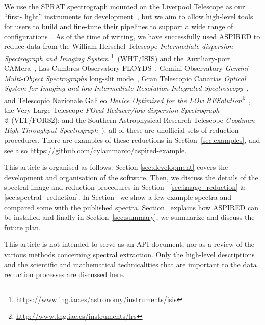 \documentclass[linenumbers, twocolumn]{aastex631}
\begin{document}
We use the SPRAT spectrograph mounted on the Liverpool Telescope as our ``first-
light'' instruments for
development~\citep{2014SPIE.9147E..8HP}, but we aim to allow high-level tools
for users to build and fine-tune their pipelines to support a wide range of
configurations~\citep{2020arXiv201203505L, marco_2021_4463569}. As of the time
of writing, we have successfully used \textsc{ASPIRED} to reduce data from the
William Herschel Telescope \textit{Intermediate-dispersion Spectrograph and
Imaging System} \footnote{\url{https://www.ing.iac.es/astronomy/instruments/isis}}~(WHT/ISIS)
and the Auxiliary-port CAMera~\citep[ACAM;][]{2008SPIE.7014E..6XB}, Las Cumbres
Observatory FLOYDS~\citep[LCO/FLOYDS;][]{2013PASP..125.1031B}, Gemini Observatory
\textit{Gemini Multi-Object Spectrographs} long-slit
mode~\citep[Gemini/GMOS-LS;][]{2004PASP..116..425H}, Gran Telescopio Canarias
\textit{Optical System for Imaging and low-Intermediate-Resolution Integrated
Spectroscopy}~\citep[GTC/OSIRIS;][]{2000SPIE.4008..623C}, and Telescopio
Nazionale Galileo \textit{Device Optimised for the LOw
RESolution\footnote{\url{http://www.tng.iac.es/instruments/lrs}}}~\citep[TNG/DOLORES;][]{1999ldss.work..157M},
the Very Large Telescope \textit{FOcal Reducer/low dispersion Spectrograph 2}~(VLT/FORS2); and the Southern Astrophysical Research Telescope \textit{Goodman High Throughput Spectrograph}~\citep[SOAR/GHTS][]{2004SPIE.5492..331C}).
all of these are unofficial sets of reduction procedures. There
are examples of these reductions in Section~\ref{sec:examples}, and see also
\url{https://github.com/cylammarco/aspired-example}.

This article is organised as follows: Section \textsection\ref{sec:development}
covers the development and organisation of the software. Then, we discuss the
details of the spectral image and reduction procedures in Section~\textsection
\ref{sec:image_reduction} \& \ref{sec:spectral_reduction}. In
Section~\textsection{\ref{sec:examples}} we show a few example spectra and
compared some with the published spectra.
Section~\textsection{\ref{sec:distribution}}
explains how \textsc{ASPIRED} can be installed and finally in 
Section~\textsection\ref{sec:summary}, we summarize and discuss the future
plan.

This article is not intended to serve as an API document, nor as a review of the
various methods concerning spectral extraction. Only the high-level
descriptions and the scientific and mathematical technicalities that are
important to the data reduction processes are discussed here.
\end{document}
